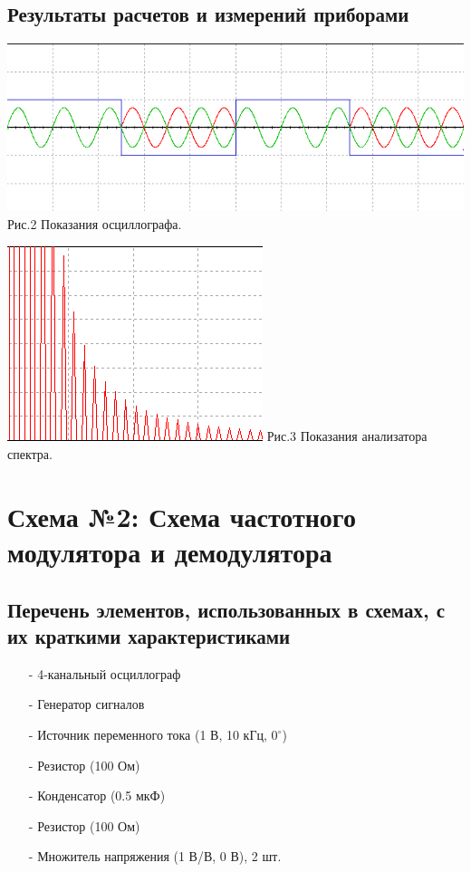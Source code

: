 \documentclass[11pt]{article}
\begin{document}
\subsection{Результаты расчетов и измерений приборами}
\begin{center}
    \includegraphics[width=1\linewidth]{img/osc1.png}
        Рис.2 Показания осциллографа.
\end{center}

\begin{center}
    \includegraphics[width=1\linewidth]{img/chast1.png}
        Рис.3 Показания анализатора спектра.
\end{center}


\newpage
\section{Схема №2: Схема частотного модулятора и демодулятора}
\subsection{Перечень элементов, использованных в схемах, с их краткими характеристиками}
\begin{itemize}
    \item[-] 4-канальный осциллограф
    \item[-] Генератор сигналов
    \item[-] Источник переменного тока (1 В, 10 кГц, $0^\circ$)
    \item[-] Резистор (100 Ом)
    \item[-] Конденсатор (0.5 мкФ)
    \item[-] Резистор (100 Ом)
    \item[-] Множитель напряжения (1 В/В, 0 В), 2 шт.  
\end{itemize}
\end{document}
